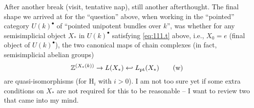 \starsbreak

After another break (visit, tentative nap), still another
afterthought. The final shape we arrived at for the ``question''
above, when working in the ``pointed'' category $U(k)^\bullet$ of
``pointed unipotent bundles over $k$'', was whether for any
semisimplicial object $X_*$ in $U(k)^\bullet$ satisfying
\eqref{eq:111.t} above, i.e., $X_0=e$ (final object of
$U(k)^\bullet$), the two canonical maps of chain complexes (in fact,
semisimplicial abelian groups)
\begin{equation}
  \label{eq:111.w}
  {\ensuremath{\mathbb{Z}}}^{(X_*(k))} \to L(X_*) \hookleftarrow L_{\mathrm{pt}}(X_*)\tag{w}
\end{equation}
are quasi-isomorphisms (for $\mathrm H_i$ with $i>0$). I am not too
sure yet if some extra conditions on $X_*$ are not required for this
to be reasonable -- I want to review two that came into my mind.

